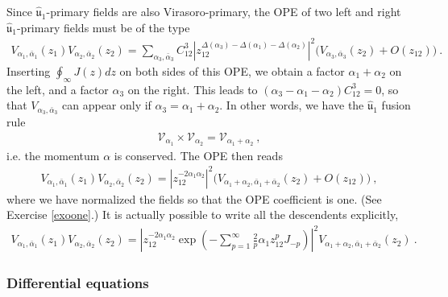 \documentclass[12pt, a4paper, notitlepage, twoside]{report}
\numberwithin{equation}{section}
\theoremstyle{break}
\begin{document}
Since $\hat{\mathfrak{u}}_1$-primary fields are also Virasoro-primary, the OPE of two left and right 
$\hat{\mathfrak{u}}_1$-primary fields must be of the type 
\begin{align}
 V_{\alpha_1,\bar\alpha_1}(z_1) V_{\alpha_2,\bar\alpha_2}(z_2) = \sum_{\alpha_3,\bar\alpha_3} C_{12}^3 \left| z_{12}^{\Delta(\alpha_3)-\Delta(\alpha_1)-\Delta(\alpha_2)}\right|^2 \Big(V_{\alpha_3,\bar\alpha_3}(z_2) + O(z_{12}) \Big)\ .
\end{align}
Inserting $\oint_\infty J(z)dz$ on both sides of this OPE, we obtain a factor $\alpha_1+\alpha_2$ on the left, and a factor $\alpha_3$ on the right.
This leads to $(\alpha_3-\alpha_1-\alpha_2)C_{12}^3=0$, so that $V_{\alpha_3,\bar\alpha_3}$ can appear only if $\alpha_3=\alpha_1+\alpha_2$. 
In other words, we have the $\hat{\mathfrak{u}}_1$ fusion rule
\begin{align}
 \boxed{\mathcal{V}_{\alpha_1}\times \mathcal{V}_{\alpha_2} = \mathcal{V}_{\alpha_1+\alpha_2}}\ ,
\label{vvp}
\end{align}
i.e. the momentum $\alpha$ is conserved.
The OPE then reads 
\begin{align}
\boxed{V_{\alpha_1,\bar\alpha_1}(z_1)V_{\alpha_2,\bar\alpha_2}(z_2) 
= 
\left| z_{12}^{-2\alpha_1\alpha_2}\right|^2 \big( V_{\alpha_1+\alpha_2,\bar\alpha_1+\bar\alpha_2}(z_2) + O(z_{12})\big)}\ ,
\label{vvoo}
\end{align}
where we have normalized the fields so that the OPE coefficient is one. (See Exercise \ref{exoone}.)
It is actually possible to write all the descendents explicitly,
\begin{align}
 V_{\alpha_1,\bar\alpha_1}(z_1)V_{\alpha_2,\bar\alpha_2}(z_2) 
= 
\left| z_{12}^{-2\alpha_1\alpha_2} \exp\left(-\sum_{p=1}^\infty \frac{2}{p}\alpha_1 z_{12}^pJ_{-p} \right)\right|^2 V_{\alpha_1+\alpha_2,\bar\alpha_1+\bar\alpha_2}(z_2) \ .
\end{align}

\subsubsection{Differential equations}
\end{document}
